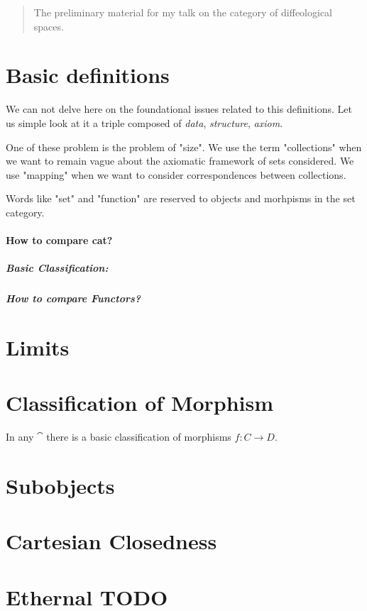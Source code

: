 \documentclass[a4paper,12pt,fleqn]{scrartcl}  %
\begin{document}
 
\begin{abstract}
	The preliminary material for my talk on the category of diffeological spaces.
\end{abstract}


\begin{appendices}

\section{Basic definitions}
	
We can not delve here on the foundational issues related to this definitions. Let us simple look at it a triple composed of \emph{data}, \emph{structure}, \emph{axiom}.

One of these problem is the problem of "size". We use the term "collections" when we want to remain vague about the axiomatic framework of sets considered.
We use "mapping" when we want to consider correspondences between collections.

Words like "set" and "function" are reserved to objects and morhpisms in the set category.

\paragraph{How to compare cat?}
	

	\subparagraph{Basic Classification:}
	

\subparagraph{How to compare Functors?}
	

\section{Limits}
	



\section{Classification of Morphism}
	In any $\cat$ there is a basic classification of morphisms $f: C \rightarrow D$.\\
	
	

\section{Subobjects}


\section{Cartesian Closedness}



\section{Ethernal TODO}
	
	
	



\end{appendices}
			\nocite{*}
			
			
\end{document}
